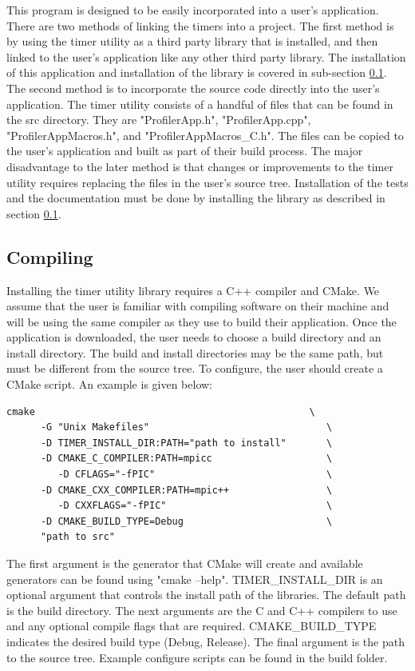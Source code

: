 \documentclass[fleqn,10pt,letterpaper]{article}
\begin{document}
This program is designed to be easily incorporated into a user's application.  
There are two methods of linking the timers into a project.  The first method 
is by using the timer utility as a third party library that is installed, and 
then linked to the user's application like any other third party library.  
The installation of this application and installation of the library is covered
in sub-section \ref{sec:install_library}.  The second method is to incorporate 
the source code directly into the user's application.  The timer utility consists
of a handful of files that can be found in the src directory.  They are 
"ProfilerApp.h", "ProfilerApp.cpp", "ProfilerAppMacros.h", and "ProfilerAppMacros\_C.h".
The files can be copied to the user's application and built as part of their 
build process.  The major disadvantage to the later method is that changes or
improvements to the timer utility requires replacing the files in the user's 
source tree.  Installation of the tests and the documentation must be done by 
installing the library as described in section \ref{sec:install_library}. 

\subsection{Compiling}  \label{sec:install_library}

Installing the timer utility library requires a C++ compiler and CMake.  
We assume that the user is familiar with compiling software on their machine
and will be using the same compiler as they use to build their application.
Once the application is downloaded, the user needs to choose a build directory
and an install directory.  The build and install directories may be the same
path, but must be different from the source tree.  To configure, the user should
create a CMake script.  An example is given below:
\begin{Verbatim}[baselinestretch=1.0]
   cmake                                                \
      -G "Unix Makefiles"                               \
      -D TIMER_INSTALL_DIR:PATH="path to install"       \
      -D CMAKE_C_COMPILER:PATH=mpicc                    \
         -D CFLAGS="-fPIC"                              \
      -D CMAKE_CXX_COMPILER:PATH=mpic++                 \
         -D CXXFLAGS="-fPIC"                            \
      -D CMAKE_BUILD_TYPE=Debug                         \
      "path to src"
\end{Verbatim}
The first argument is the generator that CMake will create and available generators
can be found using "cmake --help".  TIMER\_INSTALL\_DIR is an optional argument
that controls the install path of the libraries.  The default path is the build directory.
The next arguments are the C and C++ compilers
to use and any optional compile flags that are required.  CMAKE\_BUILD\_TYPE 
indicates the desired build type (Debug, Release).  
The final argument is the path to the source tree.
Example configure scripts can be found in the build folder.
\end{document}
